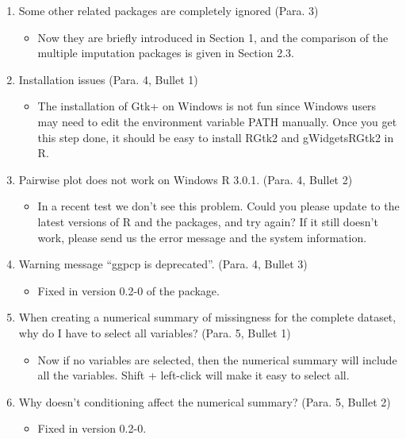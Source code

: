 \documentclass[12pt,english]{article}
\begin{document}
\begin{enumerate}
\item Some other related packages are completely ignored (Para. 3)
\begin{itemize}
\item Now they are briefly introduced in Section 1, and the comparison of
the multiple imputation packages is given in Section 2.3.
\end{itemize}

\item Installation issues (Para. 4, Bullet 1)
\begin{itemize}
\item The installation of Gtk+ on Windows is not fun since Windows users
may need to edit the environment variable PATH manually. Once you
get this step done, it should be easy to install RGtk2 and gWidgetsRGtk2
in R.
\end{itemize}

\item Pairwise plot does not work on Windows R 3.0.1. (Para. 4, Bullet 2)
\begin{itemize}
\item In a recent test we don't see this problem. Could you please update
to the latest versions of R and the packages, and try again? If it
still doesn't work, please send us the error message and the system
information.
\end{itemize}

\item Warning message ``ggpcp is deprecated''. (Para. 4, Bullet 3)
\begin{itemize}
\item Fixed in version 0.2-0 of the package.
\end{itemize}

\item When creating a numerical summary of missingness for the complete
dataset, why do I have to select all variables? (Para. 5, Bullet 1)
\begin{itemize}
\item Now if no variables are selected, then the numerical summary will
include all the variables. Shift + left-click will make it easy to
select all.
\end{itemize}

\item Why doesn\textquoteright{}t conditioning affect the numerical summary?
(Para. 5, Bullet 2)
\begin{itemize}
\item Fixed in version 0.2-0.
\end{itemize}


\end{enumerate}
\end{document}
